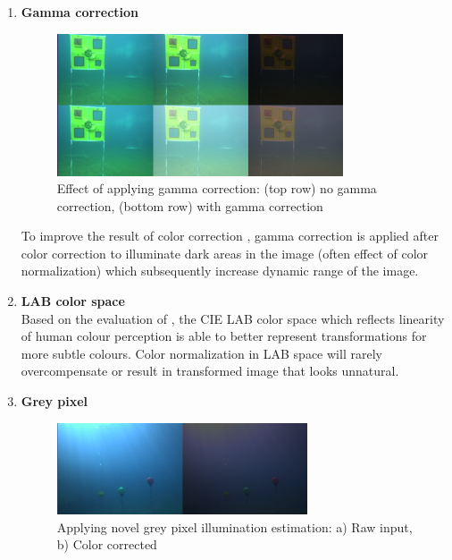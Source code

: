 \documentclass[fypca]{socreport}
\begin{document}
\begin{enumerate}

\item \textbf{Gamma correction} \\

\begin{figure}[H]
\centering
  \includegraphics[width=0.8\textwidth, height=0.3\textheight]{color_gamma.png}
  \caption{Effect of applying gamma correction: (top row) no gamma correction,
    (bottom row) with gamma correction}
  \label{fig:color_gamma}
\end{figure}

To improve the result of color correction , gamma
correction is applied after color correction to illuminate dark areas in the
image (often effect of color normalization) which subsequently increase dynamic
range of the image.

\item \textbf{LAB color space} \\
Based on the evaluation of , the CIE LAB color space
which reflects linearity of human colour perception is able to better represent
transformations for more subtle colours. Color normalization in LAB space will
rarely overcompensate or result in transformed image that looks unnatural.

\item \textbf{Grey pixel} \\

\begin{figure}[H]
\centering
  \includegraphics[width=0.7\textwidth, height=0.2\textheight]{greypixel.png}
  \caption{Applying novel grey pixel illumination estimation: a) Raw input, b)
    Color corrected}
  \label{fig:grey_pixel}
\end{figure}


\end{enumerate}
\end{document}

